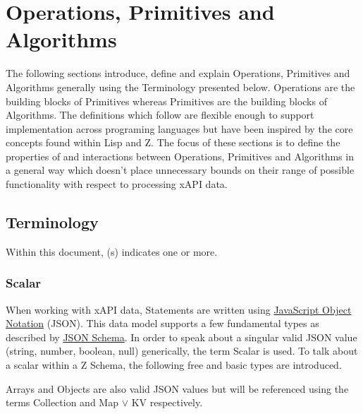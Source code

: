 \documentclass[../main.tex]{subfiles}
\begin{document}
\section{Operations, Primitives and Algorithms}
The following sections introduce, define and explain Operations, Primitives and Algorithms generally using the Terminology presented below. Operations are the building blocks of Primitives whereas Primitives are the building blocks of Algorithms. The definitions which follow are flexible enough to support implementation across programing languages but have been inspired by the core concepts found within Lisp and Z. The focus of these sections is to define the properties of and interactions between Operations, Primitives and Algorithms in a general way which doesn't place unnecessary bounds on their range of possible functionality with respect to processing xAPI data.

\subsection{Terminology}

Within this document, (s) indicates one or more.

\subsubsection{Scalar}
When working with xAPI data, Statements are written using \href{https://www.json.org/}{JavaScript Object Notation} (JSON).
This data model supports a few fundamental types as described by \href{https://json-schema.org/understanding-json-schema/reference/type.html}{JSON Schema}.
In order to speak about a singular valid JSON value (string, number, boolean, null) generically, the term Scalar is used.
To talk about a scalar within a Z Schema, the following free and basic types are introduced.
Arrays and Objects are also valid JSON values but will be referenced using the terms Collection and Map $\lor$ KV respectively.
\end{document}
